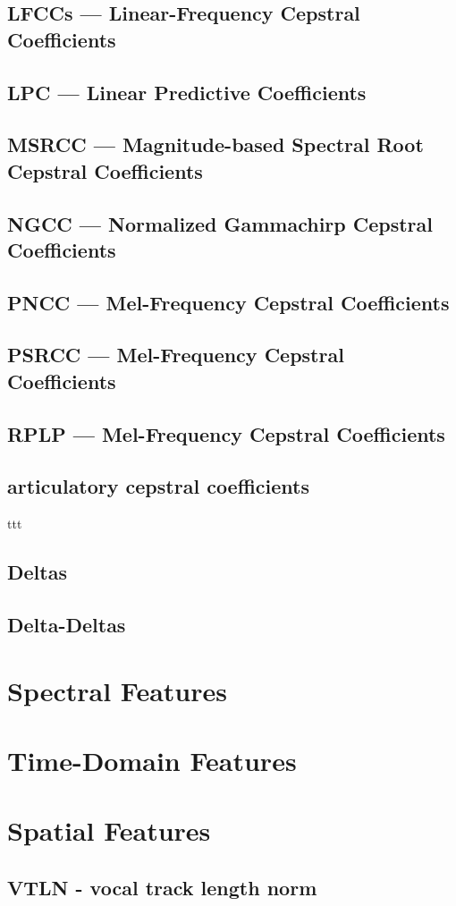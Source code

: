\subsection{LFCCs --- Linear-Frequency Cepstral Coefficients}
\subsection{LPC --- Linear Predictive Coefficients}
\subsection{MSRCC --- Magnitude-based Spectral Root Cepstral Coefficients}
\subsection{NGCC --- Normalized Gammachirp Cepstral Coefficients}
\subsection{PNCC --- Mel-Frequency Cepstral Coefficients}
\subsection{PSRCC --- Mel-Frequency Cepstral Coefficients}
\subsection{RPLP --- Mel-Frequency Cepstral Coefficients}
\subsection{articulatory cepstral coefficients}
ttt

\subsection{Deltas}
\subsection{Delta-Deltas}

\section{Spectral Features}

\section{Time-Domain Features}

\section{Spatial Features}
\subsection{VTLN - vocal track length norm}
